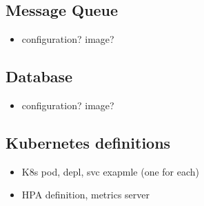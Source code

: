 \subsection{Message Queue} \label{impl-message-queue}

\begin{itemize}
	\item configuration? image?
\end{itemize}

\subsection{Database}

\begin{itemize}
	\item configuration? image?
\end{itemize}


\subsection{Kubernetes definitions}


\begin{itemize}
	\item K8s pod, depl, svc exapmle (one for each)
	\item HPA definition, metrics server
\end{itemize}
















